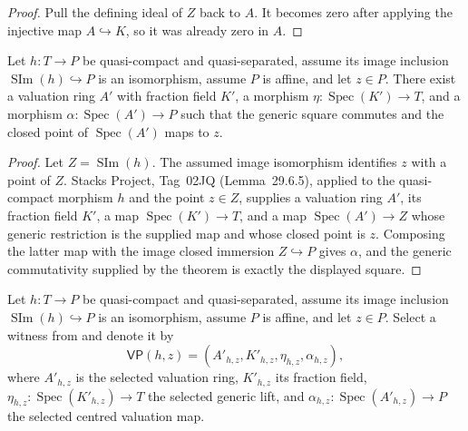 \begin{proof}
  Pull the defining ideal of $Z$ back to $A$.  It becomes zero after applying
  the injective map $A\hookrightarrow K$, so it was already zero in $A$.
\end{proof}

\begin{lemma}
  \label{lemma:nagata-dense-valuation-probe-exists}

  Let $h\colon T\to P$ be quasi-compact and quasi-separated, assume its image
  inclusion $\operatorname{SIm}(h)\hookrightarrow P$ is an isomorphism, assume
  $P$ is affine, and let $z\in P$.  There
  exist a valuation ring $A'$ with fraction field $K'$, a morphism
  $\eta\colon\operatorname{Spec}(K')\to T$, and a morphism
  $\alpha\colon\operatorname{Spec}(A')\to P$ such that the generic square
  commutes and the closed point of $\operatorname{Spec}(A')$ maps to $z$.
\end{lemma}

\begin{proof}
  Let $Z=\operatorname{SIm}(h)$.  The assumed image isomorphism identifies
  $z$ with a point of $Z$.  Stacks Project, Tag~02JQ (Lemma~29.6.5),
  applied to the quasi-compact morphism $h$ and the point $z\in Z$, supplies
  a valuation ring $A'$, its fraction field $K'$, a map
  $\operatorname{Spec}(K')\to T$, and a map
  $\operatorname{Spec}(A')\to Z$ whose generic restriction is the supplied
  map and whose closed point is $z$.  Composing the latter map with the image
  closed immersion $Z\hookrightarrow P$ gives $\alpha$, and the generic
  commutativity supplied by the theorem is exactly the displayed square.
\end{proof}

\begin{definition}
  \label{def:nagata-dense-valuation-probe}

  Let $h\colon T\to P$ be quasi-compact and quasi-separated, assume its image
  inclusion $\operatorname{SIm}(h)\hookrightarrow P$ is an isomorphism, assume
  $P$ is affine, and let $z\in P$.
  Select a witness from
   and denote it by
  \[
    \mathsf{VP}(h,z)=
      (A'_{h,z},K'_{h,z},\eta_{h,z},\alpha_{h,z}),
  \]
  where $A'_{h,z}$ is the selected valuation ring, $K'_{h,z}$ its fraction
  field, $\eta_{h,z}\colon\operatorname{Spec}(K'_{h,z})\to T$ the selected
  generic lift, and
  $\alpha_{h,z}\colon\operatorname{Spec}(A'_{h,z})\to P$ the selected centred
  valuation map.
\end{definition}

